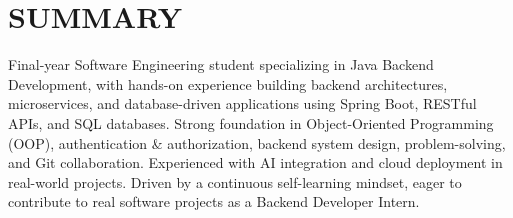 \section{SUMMARY}
\noindent Final-year Software Engineering student specializing in Java Backend Development, with hands-on experience building backend architectures, microservices, and database-driven applications using Spring Boot, RESTful APIs, and SQL databases. Strong foundation in Object-Oriented Programming (OOP), authentication \& authorization, backend system design, problem-solving, and Git collaboration. Experienced with AI integration and cloud deployment in real-world projects. Driven by a continuous self-learning mindset, eager to contribute to real software projects as a Backend Developer Intern.
